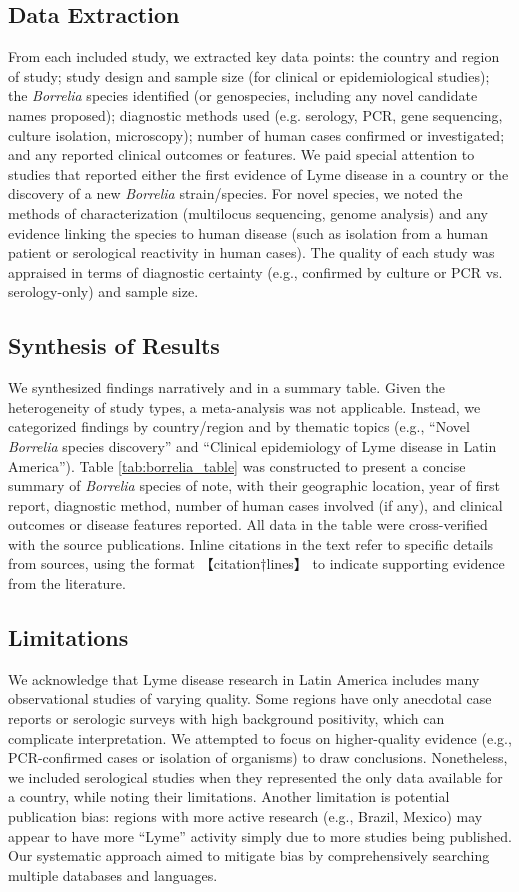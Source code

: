 \documentclass[11pt,letterpaper]{article}
\begin{document}
\subsection{Data Extraction}
From each included study, we extracted key data points: the country and region of study; study design and sample size (for clinical or epidemiological studies); the \textit{Borrelia} species identified (or genospecies, including any novel candidate names proposed); diagnostic methods used (e.g. serology, PCR, gene sequencing, culture isolation, microscopy); number of human cases confirmed or investigated; and any reported clinical outcomes or features. We paid special attention to studies that reported either the first evidence of Lyme disease in a country or the discovery of a new \textit{Borrelia} strain/species. For novel species, we noted the methods of characterization (multilocus sequencing, genome analysis) and any evidence linking the species to human disease (such as isolation from a human patient or serological reactivity in human cases). The quality of each study was appraised in terms of diagnostic certainty (e.g., confirmed by culture or PCR vs. serology-only) and sample size.

\subsection{Synthesis of Results}
We synthesized findings narratively and in a summary table. Given the heterogeneity of study types, a meta-analysis was not applicable. Instead, we categorized findings by country/region and by thematic topics (e.g., “Novel \textit{Borrelia} species discovery” and “Clinical epidemiology of Lyme disease in Latin America”). Table \ref{tab:borrelia_table} was constructed to present a concise summary of \textit{Borrelia} species of note, with their geographic location, year of first report, diagnostic method, number of human cases involved (if any), and clinical outcomes or disease features reported. All data in the table were cross-verified with the source publications. Inline citations in the text refer to specific details from sources, using the format 【citation†lines】 to indicate supporting evidence from the literature.

\subsection{Limitations}
We acknowledge that Lyme disease research in Latin America includes many observational studies of varying quality. Some regions have only anecdotal case reports or serologic surveys with high background positivity, which can complicate interpretation. We attempted to focus on higher-quality evidence (e.g., PCR-confirmed cases or isolation of organisms) to draw conclusions. Nonetheless, we included serological studies when they represented the only data available for a country, while noting their limitations. Another limitation is potential publication bias: regions with more active research (e.g., Brazil, Mexico) may appear to have more “Lyme” activity simply due to more studies being published. Our systematic approach aimed to mitigate bias by comprehensively searching multiple databases and languages.
\end{document}
